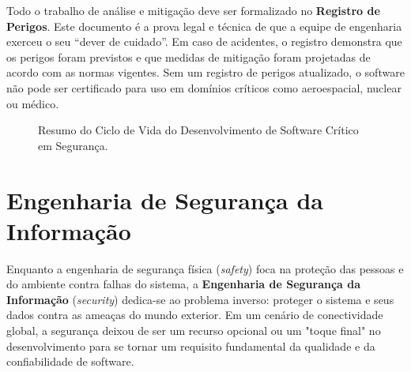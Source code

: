 \documentclass[12pt,a4paper,twoside]{report}
\begin{document}
Todo o trabalho de análise e mitigação deve ser formalizado no \textbf{Registro de Perigos}. Este documento é a prova legal e técnica de que a equipe de engenharia exerceu o seu ``dever de cuidado''. Em caso de acidentes, o registro demonstra que os perigos foram previstos e que medidas de mitigação foram projetadas de acordo com as normas vigentes. Sem um registro de perigos atualizado, o software não pode ser certificado para uso em domínios críticos como aeroespacial, nuclear ou médico.

\begin{figure}[h]
    \centering
    \caption{Resumo do Ciclo de Vida do Desenvolvimento de Software Crítico em Segurança.}
\end{figure}


\chapter{Engenharia de Segurança da Informação}

Enquanto a engenharia de segurança física (\emph{safety}) foca na proteção das pessoas e do ambiente contra falhas do sistema, a \textbf{Engenharia de Segurança da Informação} (\emph{security}) dedica-se ao problema inverso: proteger o sistema e seus dados contra as ameaças do mundo exterior. Em um cenário de conectividade global, a segurança deixou de ser um recurso opcional ou um "toque final" no desenvolvimento para se tornar um requisito fundamental da qualidade e da confiabilidade de software.
\end{document}
